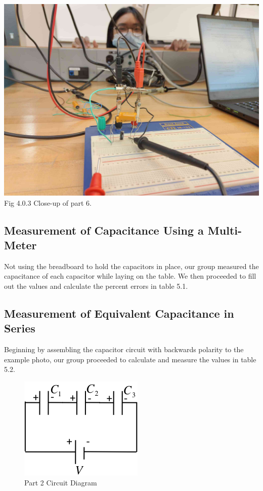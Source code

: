 \documentclass[titlepage]{article}
\begin{document}
\begin{center}
	\vspace{1cm}
	\includegraphics[scale=0.12]{selfies/part-6.jpg}\\
	Fig 4.0.3 Close-up of part 6.\\
\end{center}
        \subsection{Measurement of Capacitance Using a Multi-Meter}
        Not using the breadboard to hold the capacitors in place, our group measured the capacitance of each capacitor while laying on the table. We then proceeded to fill out the values and calculate the percent errors in table 5.1.

        \subsection{Measurement of Equivalent Capacitance in Series}
        Beginning by assembling the capacitor circuit with backwards polarity to the example photo, our group proceeded to calculate and measure the values in table 5.2.\\ 

        \begin{figure}[hbt!] 
            \centering
            \caption*{Part 2 Circuit Diagram}
            \includegraphics{images/procedure/part2.png}
        \end{figure} 
\end{document}
